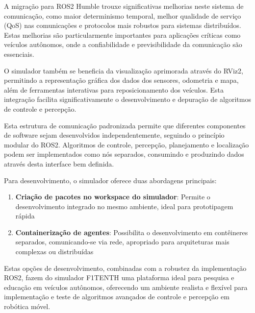 A migração para ROS2 Humble trouxe significativas melhorias neste sistema de
comunicação, como maior determinismo temporal, melhor qualidade de serviço
(QoS) nas comunicações e protocolos mais robustos para sistemas distribuídos.
Estas melhorias são particularmente importantes para aplicações críticas como
veículos autônomos, onde a confiabilidade e previsibilidade da comunicação são
essenciais.

O simulador também se beneficia da visualização aprimorada através do RViz2,
permitindo a representação gráfica dos dados dos sensores, odometria e mapa,
além de ferramentas interativas para reposicionamento dos veículos. Esta
integração facilita significativamente o desenvolvimento e depuração de
algoritmos de controle e percepção.

Esta estrutura de comunicação padronizada permite que diferentes componentes de
software sejam desenvolvidos independentemente, seguindo o princípio modular do
ROS2. Algoritmos de controle, percepção, planejamento e localização podem ser
implementados como nós separados, consumindo e produzindo dados através desta
interface bem definida.

Para desenvolvimento, o simulador oferece duas abordagens principais:

\begin{enumerate}
    \item \textbf{Criação de pacotes no workspace do simulador}: Permite o desenvolvimento integrado no mesmo ambiente, ideal para prototipagem rápida
    \item \textbf{Containerização de agentes}: Possibilita o desenvolvimento em contêineres separados, comunicando-se via rede, apropriado para arquiteturas mais complexas ou distribuídas
\end{enumerate}

Estas opções de desenvolvimento, combinadas com a robustez da implementação
ROS2, fazem do simulador F1TENTH uma plataforma ideal para pesquisa e educação
em veículos autônomos, oferecendo um ambiente realista e flexível para
implementação e teste de algoritmos avançados de controle e percepção em
robótica móvel.


